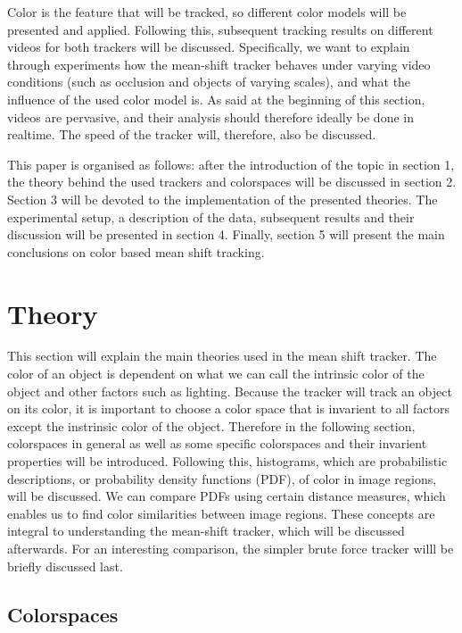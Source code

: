 \documentclass[a4paper,11pt]{article}
\begin{document}
Color is the feature that will be tracked, so different color models will be presented and applied. Following this, subsequent tracking results on different videos for both trackers will be discussed. Specifically, we want to explain through experiments how the mean-shift tracker behaves under varying video conditions (such as occlusion and objects of varying scales), and what the influence of the used color model is.
	As said at the beginning of this section, videos are pervasive, and their analysis should therefore ideally be done in realtime. The speed of the tracker will, therefore, also be discussed. 
	
	This paper is organised as follows:  after the introduction of the topic in section 1, the theory behind the used trackers and colorspaces will be discussed in section 2.
	Section 3 will be devoted to the implementation of the presented theories. The experimental setup, a description of the data, subsequent results and their discussion will be presented in section 4. 
	Finally, section 5 will present the main conclusions on color based mean shift tracking.

\section{Theory}	
	This section will explain the main theories used in the mean shift tracker. The color of an object is dependent on what we can call the intrinsic color of the object and other factors such as lighting. Because the tracker will track an object on its color, it is important to choose a color space that is invarient to all factors except the instrinsic color of the object. Therefore in the following section, colorspaces in general as well as some specific colorspaces and their invarient properties will be introduced. Following this, histograms, which are probabilistic descriptions, or probability density functions (PDF), of color in image regions, will be discussed. We can compare PDFs using certain distance measures, which enables us to find color similarities between image regions. These concepts are integral to understanding the mean-shift tracker, which will be discussed afterwards. For an interesting comparison, the simpler brute force tracker willl be briefly discussed last.  


\subsection{Colorspaces}
\end{document}
